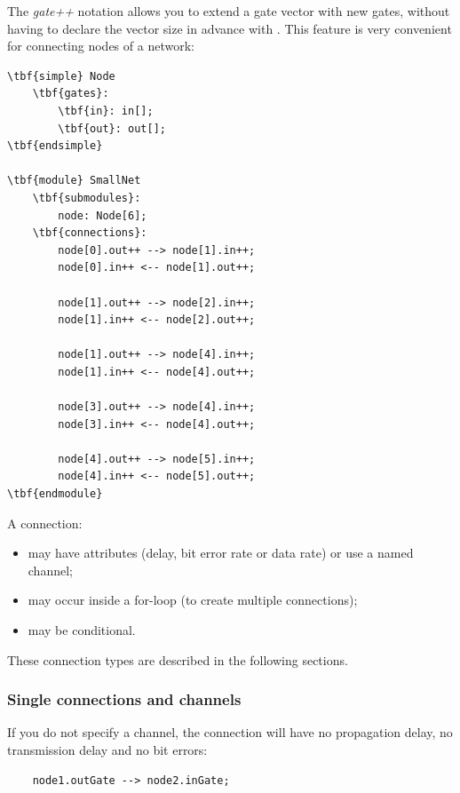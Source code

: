The \textit{gate++} notation allows you to extend a gate vector
with new gates, without having to declare the vector size in advance
with . This feature is very convenient for connecting
nodes of a network:

\begin{Verbatim}[commandchars=\\\{\}]
\tbf{simple} Node
    \tbf{gates}:
        \tbf{in}: in[];
        \tbf{out}: out[];
\tbf{endsimple}

\tbf{module} SmallNet
    \tbf{submodules}:
        node: Node[6];
    \tbf{connections}:
        node[0].out++ --> node[1].in++;
        node[0].in++ <-- node[1].out++;

        node[1].out++ --> node[2].in++;
        node[1].in++ <-- node[2].out++;

        node[1].out++ --> node[4].in++;
        node[1].in++ <-- node[4].out++;

        node[3].out++ --> node[4].in++;
        node[3].in++ <-- node[4].out++;

        node[4].out++ --> node[5].in++;
        node[4].in++ <-- node[5].out++;
\tbf{endmodule}
\end{Verbatim}


A connection:

\begin{itemize}
  \item{may have attributes (delay, bit error rate or data rate) or
        use a named channel;}
  \item{may occur inside a for-loop (to create multiple connections);}
  \item{may be conditional.}
\end{itemize}

These connection types are described in the following sections.


\subsubsection{Single connections and channels}


If you do not specify a channel, the connection will have
no propagation delay, no transmission delay and no bit errors:

\begin{verbatim}
    node1.outGate --> node2.inGate;
\end{verbatim}

